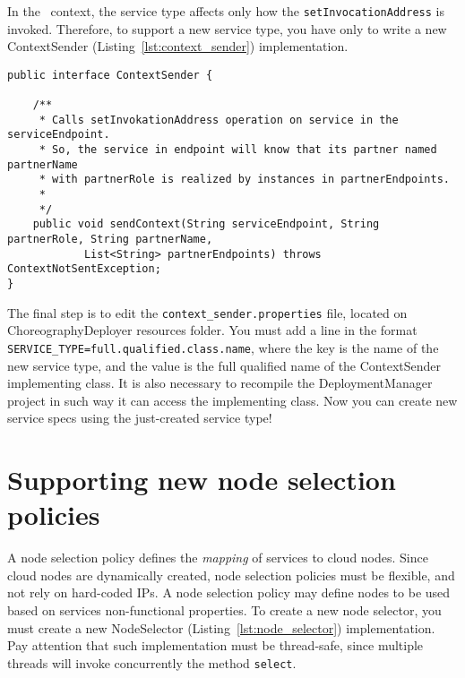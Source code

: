 In the \ee\ context, the service type affects only how the \texttt{setInvocationAddress} is invoked.
Therefore, to support a new service type, you have only to write a new \textsf{ContextSender} (Listing~\ref{lst:context_sender}) implementation.

{\footnotesize
\begin{lstlisting}[caption=\textsf{ContextSender} interface, label=lst:context_sender]
public interface ContextSender {

    /**
     * Calls setInvokationAddress operation on service in the serviceEndpoint.
     * So, the service in endpoint will know that its partner named partnerName
     * with partnerRole is realized by instances in partnerEndpoints.
     * 
     */
    public void sendContext(String serviceEndpoint, String partnerRole, String partnerName,
            List<String> partnerEndpoints) throws ContextNotSentException;
}
\end{lstlisting}
}

The final step is to edit the \texttt{context\_sender.properties} file, located on ChoreographyDeployer resources folder. You must add a line in the format \verb!SERVICE_TYPE=full.qualified.class.name!, where the key is the name of the new service type, and the value is the full qualified name of the \textsf{ContextSender} implementing class. It is also necessary to recompile the DeploymentManager project in such way it can access the implementing class. Now you can create new service specs using the just-created service type!

\section{Supporting new node selection policies}

A node selection policy defines the \emph{mapping} of services to cloud nodes.
Since cloud nodes are dynamically created, node selection policies must be flexible, and not rely on hard-coded IPs.
A node selection policy may define nodes to be used based on services non-functional properties.
To create a new node selector, you must create a new \textsf{NodeSelector} (Listing~\ref{lst:node_selector}) implementation.
Pay attention that such implementation must be thread-safe, since multiple threads will invoke concurrently the method \texttt{select}.

